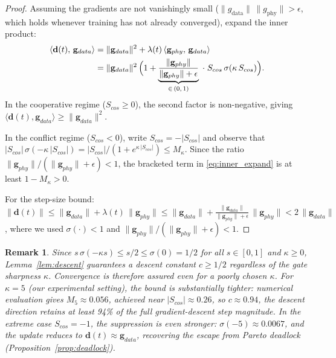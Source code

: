 \documentclass[11pt]{article}
\newtheorem{remark}[thm]{Remark}
\begin{document}
\begin{proof}
Assuming the gradients are not vanishingly small 
($\|g_{\mathrm{data}}\|\,\|g_{\mathrm{phy}}\| > \epsilon$, which holds 
whenever training has not already converged), expand the inner product:
\begin{align}
\langle \mathbf{d}(t),\, \mathbf{g}_{data} \rangle 
&= \|\mathbf{g}_{data}\|^{2} + \lambda(t)\, \langle \mathbf{g}_{phy},\, \mathbf{g}_{data} \rangle \notag \\
&= \|\mathbf{g}_{data}\|^{2}\, \Bigl(1 + \underbrace{\frac{\|\mathbf{g}_{phy}\|}{\|\mathbf{g}_{phy}\| + \epsilon}}_{\in\, (0,\, 1)} \;\cdot\; S_{cos}\, \sigma(\kappa\, S_{cos}) \Bigr). \label{eq:inner_expand}
\end{align}
In the cooperative regime ($S_{cos} \geq 0$), the second factor is non-negative, giving $\langle \mathbf{d}(t), \mathbf{g}_{data} \rangle \geq \|\mathbf{g}_{data}\|^{2}$.

In the conflict regime ($S_{cos} < 0$), write $S_{cos} = -|S_{cos}|$ and observe that $|S_{cos}|\,\sigma(-\kappa\,|S_{cos}|) = |S_{cos}|/(1 + e^{\kappa\,|S_{cos}|}) \leq M_\kappa$. Since the ratio $\|\mathbf{g}_{phy}\|/(\|\mathbf{g}_{phy}\| + \epsilon) < 1$, the bracketed term in \eqref{eq:inner_expand} is at least $1 - M_\kappa > 0$.

For the step-size bound: $\|\mathbf{d}(t)\| \leq \|\mathbf{g}_{data}\| + \lambda(t)\,\|\mathbf{g}_{phy}\| \leq \|\mathbf{g}_{data}\| + \frac{\|\mathbf{g}_{data}\|}{\|\mathbf{g}_{phy}\| + \epsilon}\, \|\mathbf{g}_{phy}\| < 2\,\|\mathbf{g}_{data}\|$, where we used $\sigma(\cdot) < 1$ and $\|\mathbf{g}_{phy}\|/(\|\mathbf{g}_{phy}\| + \epsilon) < 1$.
\end{proof}

\begin{remark}\label{rem:Mgamma}
Since $s\,\sigma(-\kappa s) \leq s/2 \leq \sigma(0) = 1/2$ for all $s \in [0,1]$ and $\kappa \geq 0$, Lemma~\ref{lem:descent} guarantees a descent constant $c \geq 1/2$ regardless of the gate sharpness $\kappa$. Convergence is therefore assured even for a poorly chosen $\kappa$. For $\kappa = 5$ (our experimental setting), the bound is substantially tighter: numerical evaluation gives $M_5 \approx 0.056$, achieved near $|S_{cos}| \approx 0.26$, so $c \approx 0.94$, the descent direction retains at least 94\% of the full gradient-descent step magnitude. In the extreme case $S_{cos} = -1$, the suppression is even stronger: $\sigma(-5) \approx 0.0067$, and the update reduces to $\mathbf{d}(t) \approx \mathbf{g}_{data}$, recovering the escape from Pareto deadlock (Proposition~\ref{prop:deadlock}).
\end{remark}
\end{document}

